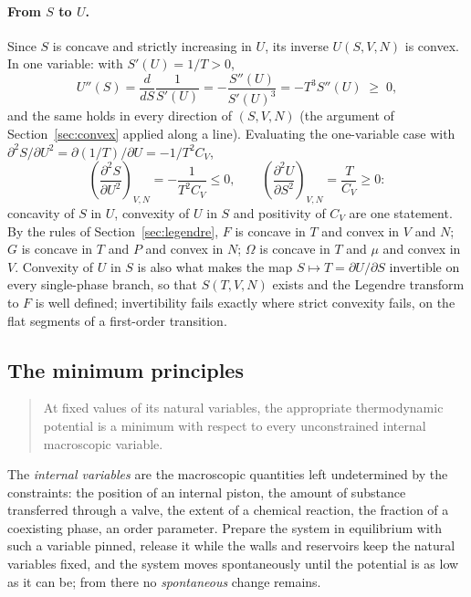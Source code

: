 \documentclass[10pt,a4paper]{article}
\theoremstyle{remark}
\begin{document}
\paragraph{From $S$ to $U$.} Since $S$ is concave and strictly increasing in
$U$, its inverse $U(S,V,N)$ is convex. In one variable: with $S'(U)=1/T>0$,
\[
  U''(S)=\frac{d}{dS}\frac{1}{S'(U)}=-\frac{S''(U)}{S'(U)^{3}}
  =-T^{3}S''(U)\;\geq\;0 ,
\]
and the same holds in every direction of $(S,V,N)$ (the argument of
Section~\ref{sec:convex} applied along a line). Evaluating the one-variable
case with $\partial^{2}S/\partial U^{2}=\partial(1/T)/\partial U=-1/T^{2}C_V$,
\begin{equation}\label{eq:USconvex}
  \left(\frac{\partial^{2}S}{\partial U^{2}}\right)_{V,N}=-\frac{1}{T^{2}C_V}\leq0 ,
  \qquad
  \left(\frac{\partial^{2}U}{\partial S^{2}}\right)_{V,N}=\frac{T}{C_V}\geq0 :
\end{equation}
concavity of $S$ in $U$, convexity of $U$ in $S$ and positivity of $C_V$ are
one statement. By the rules of Section~\ref{sec:legendre}, $F$ is concave in
$T$ and convex in $V$ and $N$; $G$ is concave in $T$ and $P$ and convex in
$N$; $\Omega$ is concave in $T$ and $\mu$ and convex in $V$. Convexity of $U$
in $S$ is also what makes the map $S\mapsto T=\partial U/\partial S$ invertible
on every single-phase branch, so that $S(T,V,N)$ exists and the Legendre
transform to $F$ is well defined; invertibility fails exactly where strict
convexity fails, on the flat segments of a first-order transition.

\subsection{The minimum principles}
\label{sec:minimum}

\begin{quote}
At fixed values of its natural variables, the appropriate thermodynamic
potential is a minimum with respect to every unconstrained internal
macroscopic variable.
\end{quote}
The \emph{internal variables} are the macroscopic quantities left undetermined
by the constraints: the position of an internal piston, the amount of substance
transferred through a valve, the extent of a chemical reaction, the fraction of
a coexisting phase, an order parameter. Prepare the system in equilibrium with
such a variable pinned, release it while the walls and reservoirs keep the
natural variables fixed, and the system moves spontaneously until the potential
is as low as it can be; from there no \emph{spontaneous} change remains.
\end{document}
